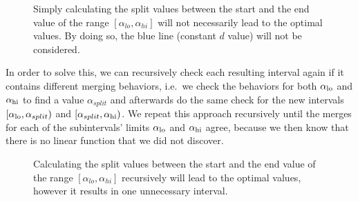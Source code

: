 \begin{figure}
    \centering
    \caption{Simply calculating the split values between the start and the end value of the range $[\alpha_{lo}, \alpha_{hi}]$ will not necessarily lead to the optimal values. By doing so, the blue line (constant $d$ value) will not be considered.}
    \label{fig:notoptimal}
\end{figure}

In order to solve this, we can recursively check each resulting interval again if it contains different merging behaviors, i.e.\ we check the behaviors for both $\alpha_\text{lo}$ and $\alpha_\text{hi}$ to find a value $\alpha_{split}$ and afterwards do the same check for the new intervals $[\alpha_\text{lo}, \alpha_{split})$ and $[\alpha_{split}, \alpha_\text{hi})$. We repeat this approach recursively until the merges for each of the subintervals' limits $\alpha_\text{lo}$ and $\alpha_\text{hi}$ agree, because we then know that there is no linear function that we did not discover.

\begin{figure}[H]
    \centering
    \caption{Calculating the split values between the start and the end value of the range $[\alpha_{lo}, \alpha_{hi}]$ recursively will lead to the optimal values, however it results in one unnecessary interval.}
    \label{fig:notoptimal2}
\end{figure}

